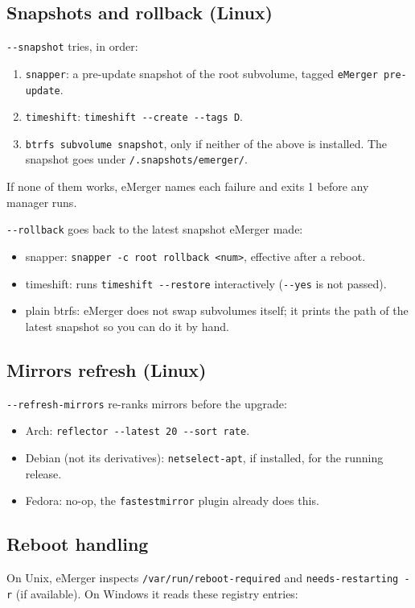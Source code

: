 \documentclass[11pt,a4paper]{article}
\begin{document}
\subsection{Snapshots and rollback (Linux)}
\texttt{-{}-snapshot} tries, in order:

\begin{enumerate}
  \item \texttt{snapper}: a pre-update snapshot of the root subvolume,
        tagged \texttt{eMerger pre-update}.
  \item \texttt{timeshift}: \texttt{timeshift -{}-create -{}-tags D}.
  \item \texttt{btrfs subvolume snapshot}, only if neither of the above is
        installed. The snapshot goes under \verb|/.snapshots/emerger/|.
\end{enumerate}

If none of them works, eMerger names each failure and exits 1 before any
manager runs.

\texttt{-{}-rollback} goes back to the latest snapshot eMerger made:

\begin{itemize}
  \item snapper: \texttt{snapper -c root rollback <num>}, effective
        after a reboot.
  \item timeshift: runs \texttt{timeshift -{}-restore} interactively
        (\texttt{-{}-yes} is not passed).
  \item plain btrfs: eMerger does not swap subvolumes itself; it prints
        the path of the latest snapshot so you can do it by hand.
\end{itemize}

\subsection{Mirrors refresh (Linux)}
\texttt{-{}-refresh-mirrors} re-ranks mirrors before the upgrade:

\begin{itemize}
  \item Arch: \texttt{reflector -{}-latest 20 -{}-sort rate}.
  \item Debian (not its derivatives): \texttt{netselect-apt}, if installed, for the running release.
  \item Fedora: no-op, the \texttt{fastestmirror} plugin already does
        this.
\end{itemize}

\subsection{Reboot handling}
On Unix, eMerger inspects \texttt{/var/run/reboot-required} and
\texttt{needs-restarting -r} (if available). On Windows it reads these
registry entries:
\end{document}

